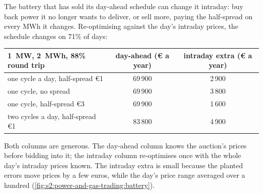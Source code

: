 The battery that has sold its day-ahead schedule can change it intraday: buy back power it no longer wants to deliver, or sell more, paying the
half-spread on every MWh it changes. Re-optimising against the day's intraday prices, the schedule changes on 71\% of days:

\begin{center}
\small
\begin{tabular}{@{}lcc@{}}
\toprule
1~MW, 2~MWh, 88\% round trip & day-ahead (\euro{} a year) & intraday extra (\euro{} a year)\\
\midrule
one cycle a day, half-spread \euro1 & 69\,900 & 2\,900\\
one cycle, no spread & 69\,900 & 3\,800\\
one cycle, half-spread \euro3 & 69\,900 & 1\,600\\
two cycles a day, half-spread \euro1 & 83\,800 & 4\,900\\
\bottomrule
\end{tabular}
\end{center}

Both columns are generous. The day-ahead column knows the auction's prices before bidding into it; the intraday column re-optimises once with the
whole day's intraday prices known. The intraday extra is small because the planted errors move prices by a few euros, while the day's price range
averaged over a hundred (\cref{fig:s2:power-and-gas-trading:battery}).

\begin{omfigure}

\label{fig:s2:power-and-gas-trading:battery}
\end{omfigure}

